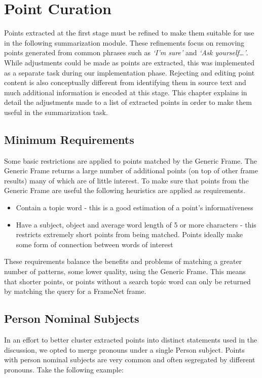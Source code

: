 \chapter{Point Curation\label{chap:point-curation}}
Points extracted at the first stage must be refined to make them suitable for use in the following summarization module. These refinements focus on removing points generated from common phrases such as \textit{`I'm sure'} and \textit{`Ask yourself\dots'}. While adjustments could be made as points are extracted, this was implemented as a separate task during our implementation phase. Rejecting and editing point content is also conceptually different from identifying them in source text and much additional information is encoded at this stage. This chapter explains in detail the adjustments made to a list of extracted points in order to make them useful in the summarization task.

  \section{Minimum Requirements}
    Some basic restrictions are applied to points matched by the Generic Frame. The Generic Frame returns a large number of additional points (on top of other frame results) many of which are of little interest. To make sure that points from the Generic Frame are useful the following heuristics are applied as requirements.

    \begin{itemize}
      \item{Contain a topic word - this is a good estimation of a point's informativeness}
      \item{Have a subject, object and average word length of 5 or more characters - this restricts extremely short points from being matched. Points ideally make some form of connection between words of interest}
    \end{itemize}

    These requirements balance the benefits and problems of matching a greater number of patterns, some lower quality, using the Generic Frame. This means that shorter points, or points without a search topic word can only be returned by matching the query for a FrameNet frame.

  \section{Person Nominal Subjects}
    In an effort to better cluster extracted points into distinct statements used in the discussion, we opted to merge pronouns under a single Person subject. Points with person nominal subjects are very common and often segregated by different pronouns. Take the following example:


